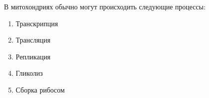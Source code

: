 
В митохондриях обычно могут происходить
следующие процессы:

\begin{enumerate}
    \item Транскрипция
    \item Трансляция
    \item Репликация
    \item Гликолиз
    \item Сборка рибосом
\end{enumerate}

\explanationSection

